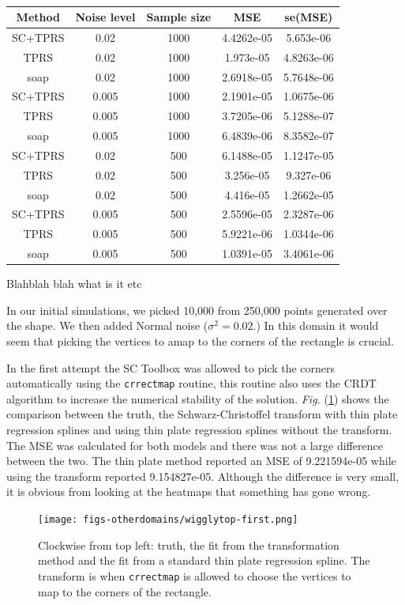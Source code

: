 \documentclass[a4paper,10pt]{amsart}
\newcommand{\sch}{Schwarz-Christoffel }
\newcommand{\Fig}[1]{\emph{Fig.} (\ref{#1})}
\begin{document}
\begin{table}[ht]
\begin{tabular}{c c c c c}\\
Method & Noise level & Sample size & MSE & se(MSE)\\
\hline
\hline
SC+TPRS & 0.02 & 1000 & 4.4262e-05 & 5.653e-06\\
TPRS & 0.02 & 1000 & 1.973e-05 & 4.8263e-06\\
soap & 0.02 & 1000 & 2.6918e-05 & 5.7648e-06\\
SC+TPRS & 0.005 & 1000 & 2.1901e-05 & 1.0675e-06\\
TPRS & 0.005 & 1000 & 3.7205e-06 & 5.1288e-07\\
soap & 0.005 & 1000 & 6.4839e-06 & 8.3582e-07\\
SC+TPRS & 0.02 & 500 & 6.1488e-05 & 1.1247e-05\\
TPRS & 0.02 & 500 & 3.256e-05 & 9.327e-06\\
soap & 0.02 & 500 & 4.416e-05 & 1.2662e-05\\
SC+TPRS & 0.005 & 500 & 2.5596e-05 & 2.3287e-06\\
TPRS & 0.005 & 500 & 5.9221e-06 & 1.0344e-06\\
soap & 0.005 & 500 & 1.0391e-05 & 3.4061e-06\\
\end{tabular}
\caption{}
\label{}
\end{table}

Blahblah blah what is it etc

In our initial simulations, we picked 10,000 from 250,000 points generated over the shape. We then added Normal noise ($\sigma^2=0.02$.) In this domain it would seem that picking the vertices to amap to the corners of the rectangle is crucial.

In the first attempt the SC Toolbox was allowed to pick the corners automatically using the \texttt{crrectmap} routine, this routine also uses the CRDT algorithm to increase the numerical stability of the solution. \Fig{wigglyfirstcomp} shows the comparison between the truth, the \sch transform with thin plate regression splines and using thin plate regression splines without the transform. The MSE was calculated for both models and there was not a large difference between the two. The thin plate method reported an MSE of 9.221594e-05 while using the transform reported 9.154827e-05. Although the difference is very small, it is obvious from looking at the heatmaps that something has gone wrong.

\begin{figure}
\centering
\texttt{[image: figs-otherdomains/wigglytop-first.png]} \\
\caption{Clockwise from top left: truth, the fit from the transformation method and the fit from a standard thin plate regression spline. The transform is when \texttt{crrectmap} is allowed to choose the vertices to map to the corners of the rectangle.}
\label{wigglyfirstcomp}
\end{figure}
\end{document}

